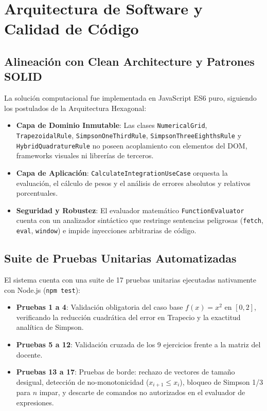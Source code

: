 \documentclass[11pt,a4paper]{article}
\begin{document}
\section{Arquitectura de Software y Calidad de Código}

\subsection{Alineación con Clean Architecture y Patrones SOLID}
La solución computacional fue implementada en JavaScript ES6 puro, siguiendo los postulados de la Arquitectura Hexagonal:
\begin{itemize}
    \item \textbf{Capa de Dominio Inmutable}: Las clases \texttt{NumericalGrid}, \texttt{TrapezoidalRule}, \texttt{SimpsonOneThirdRule}, \texttt{SimpsonThreeEighthsRule} y \texttt{HybridQuadratureRule} no poseen acoplamiento con elementos del DOM, frameworks visuales ni librerías de terceros.
    \item \textbf{Capa de Aplicación}: \texttt{CalculateIntegrationUseCase} orquesta la evaluación, el cálculo de pesos y el análisis de errores absolutos y relativos porcentuales.
    \item \textbf{Seguridad y Robustez}: El evaluador matemático \texttt{FunctionEvaluator} cuenta con un analizador sintáctico que restringe sentencias peligrosas (\texttt{fetch}, \texttt{eval}, \texttt{window}) e impide inyecciones arbitrarias de código.
\end{itemize}

\subsection{Suite de Pruebas Unitarias Automatizadas}
El sistema cuenta con una suite de 17 pruebas unitarias ejecutadas nativamente con Node.js (\texttt{npm test}):
\begin{itemize}
    \item \textbf{Pruebas 1 a 4}: Validación obligatoria del caso base $f(x)=x^2$ en $[0, 2]$, verificando la reducción cuadrática del error en Trapecio y la exactitud analítica de Simpson.
    \item \textbf{Pruebas 5 a 12}: Validación cruzada de los 9 ejercicios frente a la matriz del docente.
    \item \textbf{Pruebas 13 a 17}: Pruebas de borde: rechazo de vectores de tamaño desigual, detección de no-monotonicidad ($x_{i+1} \le x_i$), bloqueo de Simpson 1/3 para $n$ impar, y descarte de comandos no autorizados en el evaluador de expresiones.
\end{itemize}
\end{document}
